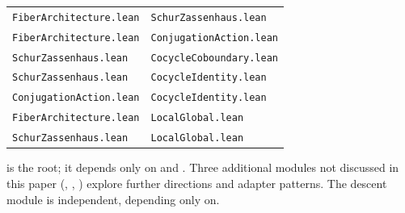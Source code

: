 \documentclass[11pt]{article}
\newcommand{\lean}[1]{\texttt{#1}}
\begin{document}
\begin{center}
\begin{tabular}{@{}l@{\;\;$\longrightarrow$\;\;}l@{}}
\lean{FiberArchitecture.lean} & \lean{SchurZassenhaus.lean} \\
\lean{FiberArchitecture.lean} & \lean{ConjugationAction.lean} \\
\lean{SchurZassenhaus.lean} & \lean{CocycleCoboundary.lean} \\
\lean{SchurZassenhaus.lean} & \lean{CocycleIdentity.lean} \\
\lean{ConjugationAction.lean} & \lean{CocycleIdentity.lean} \\
\lean{FiberArchitecture.lean} & \lean{LocalGlobal.lean} \\
\lean{SchurZassenhaus.lean} & \lean{LocalGlobal.lean} \\
\end{tabular}
\end{center}

\noindent
{} is the root; it depends only on\linebreak
{} and\linebreak
{}.
Three additional modules not discussed in this paper
(, ,
) explore further directions and adapter patterns.
The descent module  is independent, depending
only on\linebreak{}.
\end{document}
